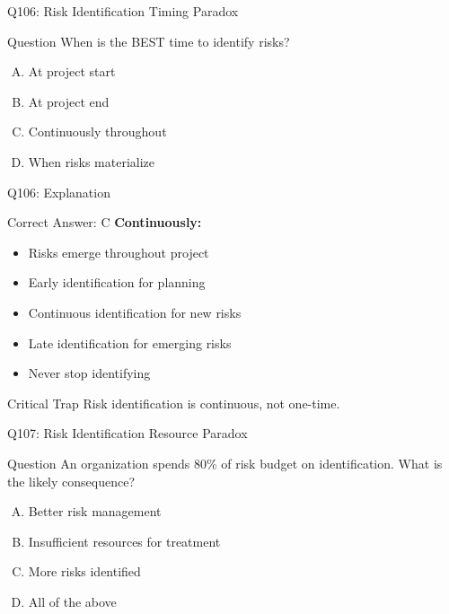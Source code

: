\documentclass{beamer}
\begin{document}
	\begin{frame}{Q106: Risk Identification Timing Paradox}
		\begin{block}{Question}
			When is the BEST time to identify risks?
		\end{block}
		\begin{enumerate}[(A)]
			\item At project start
			\item At project end
			\item Continuously throughout
			\item When risks materialize
		\end{enumerate}
	\end{frame}
	
	\begin{frame}{Q106: Explanation}
		\begin{block}{Correct Answer: C}
			\textbf{Continuously:}
			\begin{itemize}
				\item Risks emerge throughout project
				\item Early identification for planning
				\item Continuous identification for new risks
				\item Late identification for emerging risks
				\item Never stop identifying
			\end{itemize}
		\end{block}
		\begin{alertblock}{Critical Trap}
			Risk identification is continuous, not one-time.
		\end{alertblock}
	\end{frame}
	
	\begin{frame}{Q107: Risk Identification Resource Paradox}
		\begin{block}{Question}
			An organization spends 80\% of risk budget on identification. What is the likely consequence?
		\end{block}
		\begin{enumerate}[(A)]
			\item Better risk management
			\item Insufficient resources for treatment
			\item More risks identified
			\item All of the above
		\end{enumerate}
	\end{frame}
	
\end{document}
